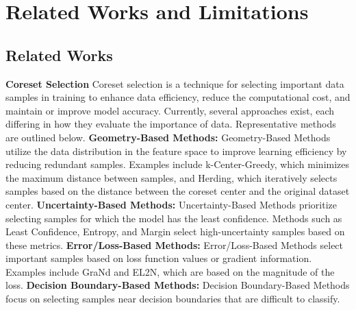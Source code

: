 
\section{Related Works and Limitations}
\label{sec:related-limits}

\subsection{Related Works}
\label{subsec:related}

\textbf{Coreset Selection}
Coreset selection is a technique for selecting important data samples in training to enhance data efficiency, reduce the computational cost, and maintain or improve model accuracy.
%
Currently, several approaches exist, each differing in how they evaluate the importance of data.
%
Representative methods are outlined below.
%
\textbf{Geometry-Based Methods:}
%
Geometry-Based Methods utilize the data distribution in the feature space to improve learning efficiency by reducing redundant samples.
%
Examples include k-Center-Greedy\citep{sener2017active}, which minimizes the maximum distance between samples, and Herding\citep{welling2009herding}, which iteratively selects samples based on the distance between the coreset center and the original dataset center.
%
\textbf{Uncertainty-Based Methods:}
%
Uncertainty-Based Methods prioritize selecting samples for which the model has the least confidence.
%
Methods such as Least Confidence, Entropy, and Margin select high-uncertainty samples based on these metrics\citep{coleman2019selection}.
%
\textbf{Error/Loss-Based Methods:}
%
Error/Loss-Based Methods select important samples based on loss function values or gradient information.
%
Examples include GraNd\citep{paul2021deep} and EL2N\citep{paul2021deep}, which are based on the magnitude of the loss.
%
%
%
\textbf{Decision Boundary-Based Methods:}
%
Decision Boundary-Based Methods focus on selecting samples near decision boundaries that are difficult to classify.
